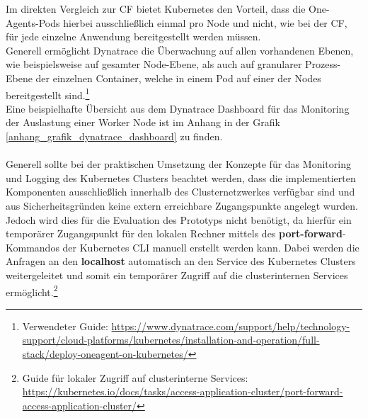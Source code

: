 Im direkten Vergleich zur \ac{CF} bietet Kubernetes den Vorteil, dass die One-Agents-Pods hierbei ausschließlich einmal pro Node und nicht, wie bei der \ac{CF}, für jede einzelne Anwendung bereitgestellt werden müssen.\\
Generell ermöglicht Dynatrace die Überwachung auf allen vorhandenen Ebenen, wie beispielsweise auf gesamter Node-Ebene, als auch auf granularer Prozess-Ebene der einzelnen Container, welche in einem Pod auf einer der Nodes bereitgestellt sind.\footnote{Verwendeter Guide: \url{https://www.dynatrace.com/support/help/technology-support/cloud-platforms/kubernetes/installation-and-operation/full-stack/deploy-oneagent-on-kubernetes/}}\\
Eine beispielhafte Übersicht aus dem Dynatrace Dashboard für das Monitoring der Auslastung einer Worker Node ist im Anhang in der Grafik \ref{anhang_grafik_dynatrace_dashboard} zu finden.\\
\\
Generell sollte bei der praktischen Umsetzung der Konzepte für das Monitoring und Logging des Kubernetes Clusters beachtet werden, dass die implementierten Komponenten ausschließlich innerhalb des Clusternetzwerkes verfügbar sind und aus Sicherheitsgründen keine extern erreichbare Zugangspunkte angelegt wurden.\\ 
Jedoch wird dies für die Evaluation des Prototyps nicht benötigt, da hierfür ein temporärer Zugangspunkt für den lokalen Rechner mittels des \textbf{port-forward}-Kommandos der Kubernetes \ac{CLI} manuell erstellt werden kann. Dabei werden die Anfragen an den \textbf{localhost} automatisch an den Service des Kubernetes Clusters weitergeleitet und somit ein temporärer Zugriff auf die clusterinternen Services ermöglicht.\footnote{Guide für lokaler Zugriff auf clusterinterne Services: \url{https://kubernetes.io/docs/tasks/access-application-cluster/port-forward-access-application-cluster/}}